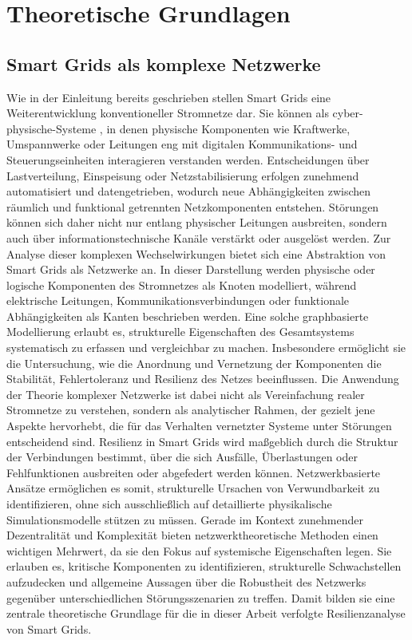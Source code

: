 \section{Theoretische Grundlagen}
\subsection{Smart Grids als komplexe Netzwerke}
Wie in der Einleitung bereits geschrieben stellen Smart Grids eine Weiterentwicklung konventioneller Stromnetze dar. Sie können als cyber-physische-Systeme , in denen physische Komponenten wie Kraftwerke, Umspannwerke oder Leitungen eng mit digitalen Kommunikations- und Steuerungseinheiten interagieren verstanden werden. Entscheidungen über Lastverteilung, Einspeisung oder Netzstabilisierung erfolgen zunehmend automatisiert und datengetrieben, wodurch neue Abhängigkeiten zwischen räumlich und funktional getrennten Netzkomponenten entstehen. Störungen können sich daher nicht nur entlang physischer Leitungen ausbreiten, sondern auch über informationstechnische Kanäle verstärkt oder ausgelöst werden.
Zur Analyse dieser komplexen Wechselwirkungen bietet sich eine Abstraktion von Smart Grids als Netzwerke an. In dieser Darstellung werden physische oder logische Komponenten des Stromnetzes als Knoten modelliert, während elektrische Leitungen, Kommunikationsverbindungen oder funktionale Abhängigkeiten als Kanten beschrieben werden. Eine solche graphbasierte Modellierung erlaubt es, strukturelle Eigenschaften des Gesamtsystems systematisch zu erfassen und vergleichbar zu machen. Insbesondere ermöglicht sie die Untersuchung, wie die Anordnung und Vernetzung der Komponenten die Stabilität, Fehlertoleranz und Resilienz des Netzes beeinflussen.
Die Anwendung der Theorie komplexer Netzwerke ist dabei nicht als Vereinfachung realer Stromnetze zu verstehen, sondern als analytischer Rahmen, der gezielt jene Aspekte hervorhebt, die für das Verhalten vernetzter Systeme unter Störungen entscheidend sind. Resilienz in Smart Grids wird maßgeblich durch die Struktur der Verbindungen bestimmt, über die sich Ausfälle, Überlastungen oder Fehlfunktionen ausbreiten oder abgefedert werden können. Netzwerkbasierte Ansätze ermöglichen es somit, strukturelle Ursachen von Verwundbarkeit zu identifizieren, ohne sich ausschließlich auf detaillierte physikalische Simulationsmodelle stützen zu müssen.
Gerade im Kontext zunehmender Dezentralität und Komplexität bieten netzwerktheoretische Methoden einen wichtigen Mehrwert, da sie den Fokus auf systemische Eigenschaften legen. Sie erlauben es, kritische Komponenten zu identifizieren, strukturelle Schwachstellen aufzudecken und allgemeine Aussagen über die Robustheit des Netzwerks gegenüber unterschiedlichen Störungsszenarien zu treffen. Damit bilden sie eine zentrale theoretische Grundlage für die in dieser Arbeit verfolgte Resilienzanalyse von Smart Grids.

